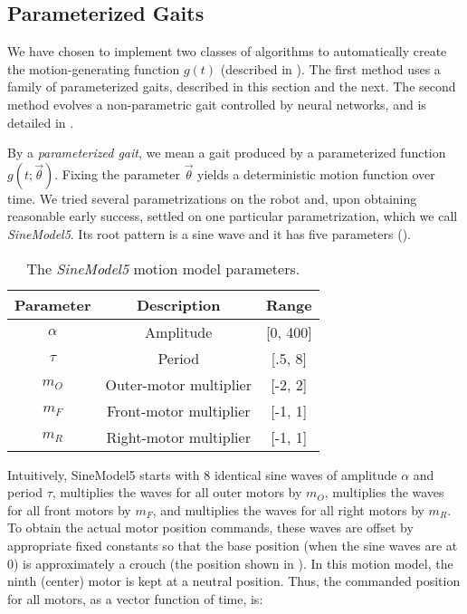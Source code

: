 \subsection{Parameterized Gaits}

We have chosen to implement two classes of algorithms to automatically create the motion-generating function $g(t)$ (described in
).  The first method uses a family of
parameterized gaits, described in this section and the next. The
second method evolves a non-parametric gait controlled by neural networks, and is detailed in
.

By a \emph{parameterized gait}, we mean a gait produced by a
parameterized function $g(t; \vec{\theta})$. Fixing the parameter
$\vec{\theta}$ yields a deterministic motion function over time.  We
tried several parametrizations on the robot and, upon obtaining
reasonable early success, settled on one particular parametrization, which we call  \emph{SineModel5}. Its root pattern is a sine wave and it has five parameters ().

\newcommand{\amp}{\ensuremath{\alpha}}

\begin{table}[h!]
\begin{center}
\begin{tabular}{|c|c|c|}
\hline
Parameter    & Description               & Range \\
\hline
\hline
\amp         & Amplitude                 & [0, 400] \\
\hline
$\tau$       & Period                    & [.5, 8] \\
\hline
$m_O$        & Outer-motor multiplier    & [-2, 2] \\
\hline
$m_F$        & Front-motor multiplier    & [-1, 1] \\
\hline
$m_R$        & Right-motor multiplier    & [-1, 1] \\
\hline
\end{tabular}
\caption{The \emph{SineModel5} motion model parameters.}
\label{tab:params}
\end{center}
\end{table}

Intuitively, SineModel5 starts with 8 identical sine waves of
amplitude $\amp$ and period $\tau$, multiplies the waves for all outer
motors by $m_O$, multiplies the waves for all front motors by $m_F$,
and multiplies the waves for all right motors by $m_R$.  To obtain the
actual motor position commands, these waves are offset by
appropriate fixed constants so that the base position (when the sine
waves are at 0) is approximately a crouch (the position shown in
).  In this motion model, the ninth
(center) motor is kept at a neutral position.  Thus, the commanded
position for all motors, as a vector function of time, is:

